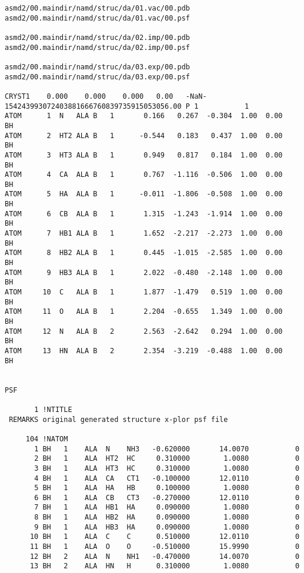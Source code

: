 \documentclass[11pt]{article}
\begin{document}
\begin{verbatim}
asmd2/00.maindir/namd/struc/da/01.vac/00.pdb
asmd2/00.maindir/namd/struc/da/01.vac/00.psf

asmd2/00.maindir/namd/struc/da/02.imp/00.pdb
asmd2/00.maindir/namd/struc/da/02.imp/00.psf

asmd2/00.maindir/namd/struc/da/03.exp/00.pdb
asmd2/00.maindir/namd/struc/da/03.exp/00.psf

CRYST1    0.000    0.000    0.000   0.00   -NaN-154243993072403881666760839735915053056.00 P 1           1
ATOM      1  N   ALA B   1       0.166   0.267  -0.304  1.00  0.00      BH  
ATOM      2  HT2 ALA B   1      -0.544   0.183   0.437  1.00  0.00      BH  
ATOM      3  HT3 ALA B   1       0.949   0.817   0.184  1.00  0.00      BH  
ATOM      4  CA  ALA B   1       0.767  -1.116  -0.506  1.00  0.00      BH  
ATOM      5  HA  ALA B   1      -0.011  -1.806  -0.508  1.00  0.00      BH  
ATOM      6  CB  ALA B   1       1.315  -1.243  -1.914  1.00  0.00      BH  
ATOM      7  HB1 ALA B   1       1.652  -2.217  -2.273  1.00  0.00      BH  
ATOM      8  HB2 ALA B   1       0.445  -1.015  -2.585  1.00  0.00      BH  
ATOM      9  HB3 ALA B   1       2.022  -0.480  -2.148  1.00  0.00      BH  
ATOM     10  C   ALA B   1       1.877  -1.479   0.519  1.00  0.00      BH  
ATOM     11  O   ALA B   1       2.204  -0.655   1.349  1.00  0.00      BH  
ATOM     12  N   ALA B   2       2.563  -2.642   0.294  1.00  0.00      BH  
ATOM     13  HN  ALA B   2       2.354  -3.219  -0.488  1.00  0.00      BH  


PSF

       1 !NTITLE
 REMARKS original generated structure x-plor psf file

     104 !NATOM
       1 BH   1    ALA  N    NH3   -0.620000       14.0070           0
       2 BH   1    ALA  HT2  HC     0.310000        1.0080           0
       3 BH   1    ALA  HT3  HC     0.310000        1.0080           0
       4 BH   1    ALA  CA   CT1   -0.100000       12.0110           0
       5 BH   1    ALA  HA   HB     0.100000        1.0080           0
       6 BH   1    ALA  CB   CT3   -0.270000       12.0110           0
       7 BH   1    ALA  HB1  HA     0.090000        1.0080           0
       8 BH   1    ALA  HB2  HA     0.090000        1.0080           0
       9 BH   1    ALA  HB3  HA     0.090000        1.0080           0
      10 BH   1    ALA  C    C      0.510000       12.0110           0
      11 BH   1    ALA  O    O     -0.510000       15.9990           0
      12 BH   2    ALA  N    NH1   -0.470000       14.0070           0
      13 BH   2    ALA  HN   H      0.310000        1.0080           0

\end{verbatim}
\end{document}
